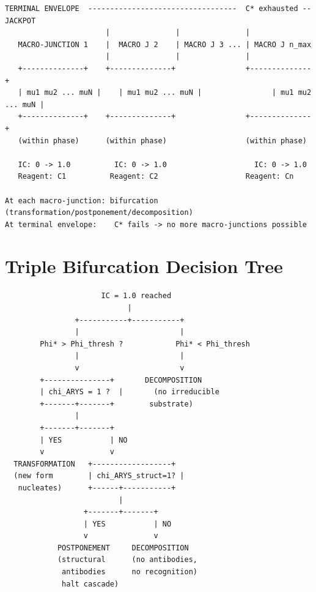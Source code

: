 \documentclass[12pt,a4paper]{article}
\begin{document}
\begin{verbatim}
TERMINAL ENVELOPE  ----------------------------------  C* exhausted -- JACKPOT
                       |               |               |
   MACRO-JUNCTION 1    |  MACRO J 2    | MACRO J 3 ... | MACRO J n_max
                       |               |               |
   +--------------+    +--------------+                +--------------+
   | mu1 mu2 ... muN |    | mu1 mu2 ... muN |                | mu1 mu2 ... muN |
   +--------------+    +--------------+                +--------------+
   (within phase)      (within phase)                  (within phase)

   IC: 0 -> 1.0          IC: 0 -> 1.0                    IC: 0 -> 1.0
   Reagent: C1          Reagent: C2                    Reagent: Cn

At each macro-junction: bifurcation (transformation/postponement/decomposition)
At terminal envelope:    C* fails -> no more macro-junctions possible
\end{verbatim}

\section{Triple Bifurcation Decision Tree}\label{app:bif_tree}

\begin{verbatim}
                      IC = 1.0 reached
                            |
                +-----------+-----------+
                |                       |
        Phi* > Phi_thresh ?            Phi* < Phi_thresh
                |                       |
                v                       v
        +---------------+       DECOMPOSITION
        | chi_ARYS = 1 ?  |       (no irreducible
        +-------+-------+        substrate)
                |
        +-------+-------+
        | YES           | NO
        v               v
  TRANSFORMATION   +------------------+
  (new form        | chi_ARYS_struct=1? |
   nucleates)      +------+-----------+
                          |
                  +-------+-------+
                  | YES           | NO
                  v               v
            POSTPONEMENT     DECOMPOSITION
            (structural      (no antibodies,
             antibodies      no recognition)
             halt cascade)
\end{verbatim}
\end{document}
